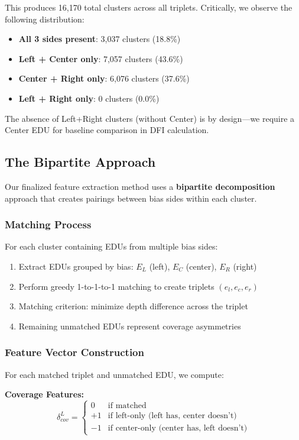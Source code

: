 \documentclass[11pt]{article}
\begin{document}
This produces 16,170 total clusters across all triplets. Critically, we observe the following distribution:
\begin{itemize}
    \item \textbf{All 3 sides present}: 3,037 clusters (18.8\%)
    \item \textbf{Left + Center only}: 7,057 clusters (43.6\%)
    \item \textbf{Center + Right only}: 6,076 clusters (37.6\%)
    \item \textbf{Left + Right only}: 0 clusters (0.0\%)
\end{itemize}

The absence of Left+Right clusters (without Center) is by design---we require a Center EDU for baseline comparison in DFI calculation.

\subsection{The Bipartite Approach}

Our finalized feature extraction method uses a \textbf{bipartite decomposition} approach that creates pairings between bias sides within each cluster.

\subsubsection{Matching Process}

For each cluster containing EDUs from multiple bias sides:
\begin{enumerate}
    \item Extract EDUs grouped by bias: $E_L$ (left), $E_C$ (center), $E_R$ (right)
    \item Perform greedy 1-to-1-to-1 matching to create triplets $(e_l, e_c, e_r)$
    \item Matching criterion: minimize depth difference across the triplet
    \item Remaining unmatched EDUs represent coverage asymmetries
\end{enumerate}

\subsubsection{Feature Vector Construction}

For each matched triplet and unmatched EDU, we compute:

\textbf{Coverage Features:}
\begin{equation}
\delta_{cov}^{L} = \begin{cases}
0 & \text{if matched} \\
+1 & \text{if left-only (left has, center doesn't)} \\
-1 & \text{if center-only (center has, left doesn't)}
\end{cases}
\end{equation}
\end{document}
